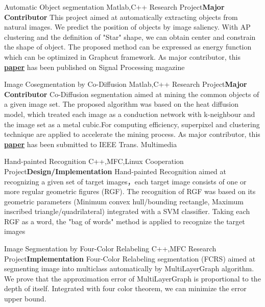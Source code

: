 \documentclass[11pt,a4paper,sans]{moderncv}   %
\begin{document}
\begin{CJK}{UTF8}{gbsn}
{Automatic Object segmentation}
{Matlab,C++}
{Research Project}{\textbf{Major Contributor}}
{This project aimed at automatically extracting objects from natural images. We predict the position of objects by image saliency. With AP clustering and the definition of "Star" shape, we can obtain center and constrain the shape of object. The proposed method can be expressed as energy function which can be optimized in Graphcut framework. As major contributor, this \textbf{\href{http://www.sciencedirect.com/science/article/pii/S0165168414002163}{paper}} has been published on Signal Processing magazine}
\vspace*{0.2\baselineskip}

{Image Cosegmentation by Co-Diffusion}
{Matlab,C++}
{Research Project}{\textbf{Major Contributor}}
{Co-Diffusion segmentation aimed at mining the common objects of a given image set. The proposed algorithm was based on the heat diffusion model, which treated each image as a conduction network with k-neighbour and the image set as a metal cubic.For computing efficiency, superpixel and clustering technique are applied to accelerate the mining process. As major contributor, this \textbf{\href{http://files.cnblogs.com/moondark/XiangliLiao_CoDiffusion.pdf}{paper}} has been submitted to IEEE Trans. Multimedia}
\vspace*{0.2\baselineskip}

{Hand-painted Recognition}
{C++,MFC,Linux}
{Cooperation Project}{\textbf{Design/Implementation}}
{Hand-painted Recognition aimed at recognizing a given set of target images，each target image consists of one or more regular geometric figures (RGF). The recognition of RGF was based on its geometric parameters (Minimum convex hull/bounding rectangle, Maximum inscribed triangle/quadrilateral) integrated with a SVM classifier. Taking each RGF as a word, the "bag of words" method is applied to recognize the target images}
\vspace*{0.2\baselineskip}

{Image Segmentation by Four-Color Relabeling}
{C++,MFC}
{Research Project}{\textbf{Implementation}}
{Four-Color Relabeling segmentation (FCRS) aimed at segmenting image into multiclass automatically by MultiLayerGraph algorithm. We prove that the approximation error of MultiLayerGraph is proportional to the depth of itself. Integrated with four color theorem, we can minimize the error upper bound. }
\vspace*{0.2\baselineskip}


\end{CJK}
\end{document}
